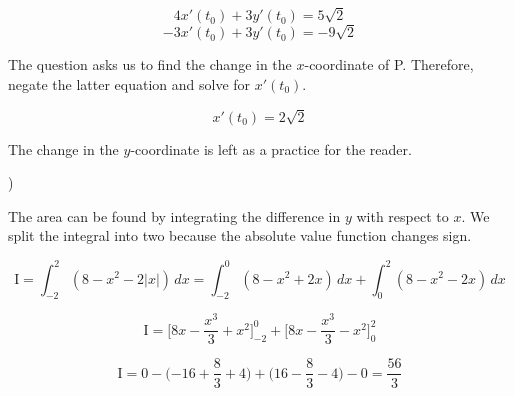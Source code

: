 \documentclass{article}
\begin{document}
\begin{equation*}4x'(t_0)+3y'(t_0) = 5\sqrt{2} \end{equation*}
\begin{equation*}-3x'(t_0)+3y'(t_0) = -9\sqrt{2} \end{equation*}

\hfill

\noindent The question asks us to find the change in the $x$-coordinate of P. Therefore, negate the latter equation and solve for $x'(t_0)$.

\begin{equation*} \boxed{x'(t_0) = 2\sqrt{2}} \end{equation*}

\hfill

\noindent The change in the $y$-coordinate is left as a practice for the reader.

\hfill

)

\begin{center}
\end{center}

\noindent The area can be found by integrating the difference in $y$ with respect to $x$. We split the integral into two because the absolute value function changes sign.

\begin{equation*}\text{I} = \int_{-2}^2 (8-x^2-2|x|)\,dx = \int_{-2}^0 (8-x^2+2x)\,dx + \int_{0}^2 (8-x^2 - 2x)\,dx\end{equation*}

\begin{equation*}\text{I} = \Bigg[8x-\frac{x^3}{3} + x^2 \Bigg]_{-2}^0 + \Bigg[8x-\frac{x^3}{3} - x^2 \Bigg]_{0}^2\end{equation*}

\begin{equation*}\text{I} = 0 - \Big({-16} + \frac{8}{3} + 4\Big) + \Big(16 - \frac{8}{3} - 4\Big) - 0 = \boxed{\frac{56}{3}}\end{equation*}
\end{document}
